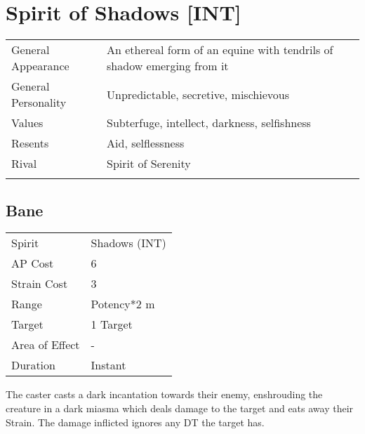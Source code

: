 \documentclass[11pt,a4paper,twocolumn]{book}
\begin{document}
\section*{Spirit of Shadows [INT]}

{
	\begin{tabu} to 75mm{| X[l,4] | X[l,8] |}
		\hline
		General Appearance  & An ethereal form of an equine with tendrils of shadow emerging from it \\
		General Personality & Unpredictable, secretive, mischievous                         \\
		Values              & Subterfuge, intellect, darkness, selfishness                                                \\
		Resents             & Aid, selflessness                                        \\
		Rival               & Spirit of Serenity                                                       \\
		                    &                                                                          \\ \hline
	\end{tabu}
	
}

\medskip


\subsection*{Bane}
{
	\begin{tabu} to 70mm{| X[l,4] | X[l,7] |}
		\hline
		Spirit         & Shadows (INT) \\
		AP Cost        & 6             \\
		Strain Cost    & 3             \\
		Range          & Potency*2 m   \\
		Target         & 1 Target      \\
		Area of Effect & -             \\
		Duration       & Instant       \\ \hline
	\end{tabu}
	
}
\medskip
The caster casts a dark incantation towards their enemy, enshrouding the creature in a dark miasma which deals damage to the target and eats away their Strain. The damage inflicted ignores any DT the target has.
\end{document}
